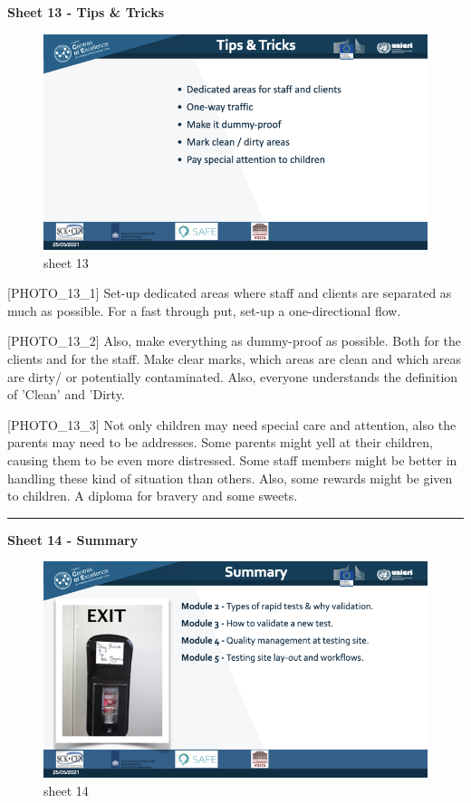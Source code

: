 \documentclass[
]{book}
\begin{document}
\textbf{Sheet 13 - Tips \& Tricks}

\begin{figure}
\centering
\includegraphics{images/m05/m05_Workflow_final.013.jpeg}
\caption{sheet 13}
\end{figure}

{[}PHOTO\_13\_1{]} Set-up dedicated areas where staff and clients are
separated as much as possible. For a fast through put, set-up a
one-directional flow.

{[}PHOTO\_13\_2{]} Also, make everything as dummy-proof as possible. Both
for the clients and for the staff. Make clear marks, which areas are
clean and which areas are dirty/ or potentially contaminated. Also,
everyone understands the definition of 'Clean' and 'Dirty.

{[}PHOTO\_13\_3{]} Not only children may need special care and attention,
also the parents may need to be addresses. Some parents might yell at
their children, causing them to be even more distressed. Some staff
members might be better in handling these kind of situation than others.
Also, some rewards might be given to children. A diploma for bravery and
some sweets.

\begin{center}\rule{0.5\linewidth}{0.5pt}\end{center}

\textbf{Sheet 14 - Summary}

\begin{figure}
\centering
\includegraphics{images/m05/m05_Workflow_final.014.jpeg}
\caption{sheet 14}
\end{figure}
\end{document}
